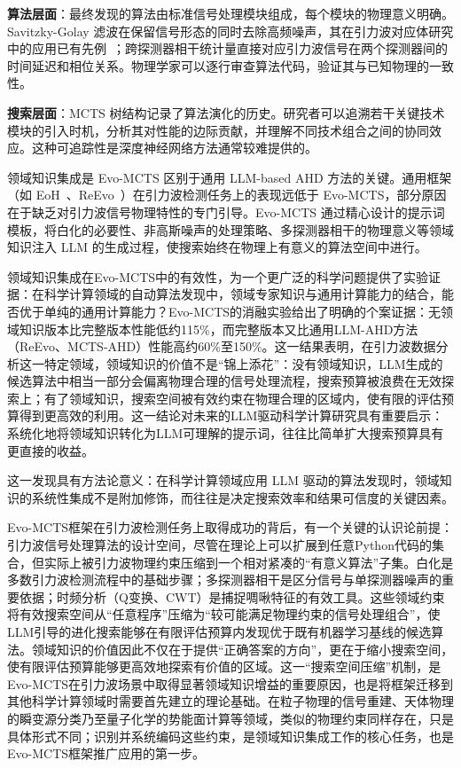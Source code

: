 \textbf{算法层面}：最终发现的算法由标准信号处理模块组成，每个模块的物理意义明确。Savitzky-Golay 滤波在保留信号形态的同时去除高频噪声，其在引力波对应体研究中的应用已有先例~\cite{wang2025evomcts}；跨探测器相干统计量直接对应引力波信号在两个探测器间的时间延迟和相位关系。物理学家可以逐行审查算法代码，验证其与已知物理的一致性。

\textbf{搜索层面}：MCTS 树结构记录了算法演化的历史。研究者可以追溯若干关键技术模块的引入时机，分析其对性能的边际贡献，并理解不同技术组合之间的协同效应。这种可追踪性是深度神经网络方法通常较难提供的。

领域知识集成是 Evo-MCTS 区别于通用 LLM-based AHD 方法的关键。通用框架（如 EoH~\cite{liu2024eoh}、ReEvo~\cite{ye2024reevo}）在引力波检测任务上的表现远低于 Evo-MCTS，部分原因在于缺乏对引力波信号物理特性的专门引导。Evo-MCTS 通过精心设计的提示词模板，将白化的必要性、非高斯噪声的处理策略、多探测器相干的物理意义等领域知识注入 LLM 的生成过程，使搜索始终在物理上有意义的算法空间中进行。

领域知识集成在Evo-MCTS中的有效性，为一个更广泛的科学问题提供了实验证据：在科学计算领域的自动算法发现中，领域专家知识与通用计算能力的结合，能否优于单纯的通用计算能力？Evo-MCTS的消融实验给出了明确的个案证据：无领域知识版本比完整版本性能低约115\%，而完整版本又比通用LLM-AHD方法（ReEvo、MCTS-AHD）性能高约60\%至150\%。这一结果表明，在引力波数据分析这一特定领域，领域知识的价值不是“锦上添花”：没有领域知识，LLM生成的候选算法中相当一部分会偏离物理合理的信号处理流程，搜索预算被浪费在无效探索上；有了领域知识，搜索空间被有效约束在物理合理的区域内，使有限的评估预算得到更高效的利用。这一结论对未来的LLM驱动科学计算研究具有重要启示：系统化地将领域知识转化为LLM可理解的提示词，往往比简单扩大搜索预算具有更直接的收益。

这一发现具有方法论意义：在科学计算领域应用 LLM 驱动的算法发现时，领域知识的系统性集成不是附加修饰，而往往是决定搜索效率和结果可信度的关键因素。

Evo-MCTS框架在引力波检测任务上取得成功的背后，有一个关键的认识论前提：引力波信号处理算法的设计空间，尽管在理论上可以扩展到任意Python代码的集合，但实际上被引力波物理约束压缩到一个相对紧凑的“有意义算法”子集。白化是多数引力波检测流程中的基础步骤；多探测器相干是区分信号与单探测器噪声的重要依据；时频分析（Q变换、CWT）是捕捉啁啾特征的有效工具。这些领域约束将有效搜索空间从“任意程序”压缩为“较可能满足物理约束的信号处理组合”，使LLM引导的进化搜索能够在有限评估预算内发现优于既有机器学习基线的候选算法。领域知识的价值因此不仅在于提供“正确答案的方向”，更在于缩小搜索空间，使有限评估预算能够更高效地探索有价值的区域。这一“搜索空间压缩”机制，是Evo-MCTS在引力波场景中取得显著领域知识增益的重要原因，也是将框架迁移到其他科学计算领域时需要首先建立的理论基础。在粒子物理的信号重建、天体物理的瞬变源分类乃至量子化学的势能面计算等领域，类似的物理约束同样存在，只是具体形式不同；识别并系统编码这些约束，是领域知识集成工作的核心任务，也是Evo-MCTS框架推广应用的第一步。


